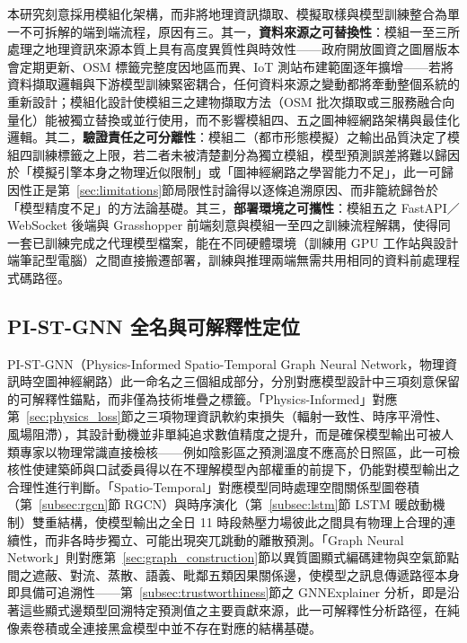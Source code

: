 本研究刻意採用模組化架構，而非將地理資訊擷取、模擬取樣與模型訓練整合為單一不可拆解的端到端流程，原因有三。其一，\textbf{資料來源之可替換性}：模組一至三所處理之地理資訊來源本質上具有高度異質性與時效性——政府開放圖資之圖層版本會定期更新、OSM 標籤完整度因地區而異、IoT 測站布建範圍逐年擴增——若將資料擷取邏輯與下游模型訓練緊密耦合，任何資料來源之變動都將牽動整個系統的重新設計；模組化設計使模組三之建物擷取方法（OSM 批次擷取或三服務融合向量化）能被獨立替換或並行使用，而不影響模組四、五之圖神經網路架構與最佳化邏輯。其二，\textbf{驗證責任之可分離性}：模組二（都市形態模擬）之輸出品質決定了模組四訓練標籤之上限，若二者未被清楚劃分為獨立模組，模型預測誤差將難以歸因於「模擬引擎本身之物理近似限制」或「圖神經網路之學習能力不足」，此一可歸因性正是第~\ref{sec:limitations}節局限性討論得以逐條追溯原因、而非籠統歸咎於「模型精度不足」的方法論基礎。其三，\textbf{部署環境之可攜性}：模組五之 FastAPI／WebSocket 後端與 Grasshopper 前端刻意與模組一至四之訓練流程解耦，使得同一套已訓練完成之代理模型檔案，能在不同硬體環境（訓練用 GPU 工作站與設計端筆記型電腦）之間直接搬遷部署，訓練與推理兩端無需共用相同的資料前處理程式碼路徑。

\subsection{PI-ST-GNN 全名與可解釋性定位}
\label{subsec:framework_interpretability}

PI-ST-GNN（Physics-Informed Spatio-Temporal Graph Neural Network，物理資訊時空圖神經網路）此一命名之三個組成部分，分別對應模型設計中三項刻意保留的可解釋性錨點，而非僅為技術堆疊之標籤。「Physics-Informed」對應第~\ref{sec:physics_loss}節之三項物理資訊軟約束損失（輻射一致性、時序平滑性、風場阻滯），其設計動機並非單純追求數值精度之提升，而是確保模型輸出可被人類專家以物理常識直接檢核——例如陰影區之預測溫度不應高於日照區，此一可檢核性使建築師與口試委員得以在不理解模型內部權重的前提下，仍能對模型輸出之合理性進行判斷。「Spatio-Temporal」對應模型同時處理空間關係型圖卷積（第~\ref{subsec:rgcn}節 RGCN）與時序演化（第~\ref{subsec:lstm}節 LSTM 暖啟動機制）雙重結構，使模型輸出之全日 11 時段熱壓力場彼此之間具有物理上合理的連續性，而非各時步獨立、可能出現突兀跳動的離散預測。「Graph Neural Network」則對應第~\ref{sec:graph_construction}節以異質圖顯式編碼建物與空氣節點間之遮蔽、對流、蒸散、語義、毗鄰五類因果關係邊，使模型之訊息傳遞路徑本身即具備可追溯性——第~\ref{subsec:trustworthiness}節之 GNNExplainer 分析，即是沿著這些顯式邊類型回溯特定預測值之主要貢獻來源，此一可解釋性分析路徑，在純像素卷積或全連接黑盒模型中並不存在對應的結構基礎。

